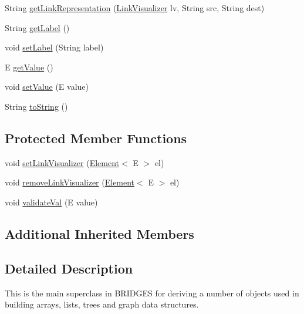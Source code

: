 \begin{DoxyCompactItemize}
\item 
String \hyperlink{classbridges_1_1base_1_1_element_ae32deb37d1ad95d2fdfaa616062f319d}{get\+Link\+Representation} (\hyperlink{classbridges_1_1base_1_1_link_visualizer}{Link\+Visualizer} lv, String src, String dest)
\item 
String \hyperlink{classbridges_1_1base_1_1_element_a5c831a0238de487765f6021a887f1542}{get\+Label} ()
\item 
void \hyperlink{classbridges_1_1base_1_1_element_a942ccd766aeca0c4fdbe27ef8cbe78d9}{set\+Label} (String label)
\item 
E \hyperlink{classbridges_1_1base_1_1_element_a44ddc61db34b6cf0bab7dfba667d54af}{get\+Value} ()
\item 
void \hyperlink{classbridges_1_1base_1_1_element_ab3cf1241da0bc4c59cea9d6f0fd7aaf4}{set\+Value} (E value)
\item 
String \hyperlink{classbridges_1_1base_1_1_element_a7dc685e317fd9dc2e73e049a9f907e42}{to\+String} ()
\end{DoxyCompactItemize}
\subsection*{Protected Member Functions}
\begin{DoxyCompactItemize}
\item 
void \hyperlink{classbridges_1_1base_1_1_element_af6251f52b9d277dd77e3bab1829d0197}{set\+Link\+Visualizer} (\hyperlink{classbridges_1_1base_1_1_element}{Element}$<$ E $>$ el)
\item 
void \hyperlink{classbridges_1_1base_1_1_element_a144cd54e043a801fab326769a5da01e2}{remove\+Link\+Visualizer} (\hyperlink{classbridges_1_1base_1_1_element}{Element}$<$ E $>$ el)
\item 
void \hyperlink{classbridges_1_1base_1_1_element_af1a60f4e6a91d379179f7d56e6dc3829}{validate\+Val} (E value)
\end{DoxyCompactItemize}
\subsection*{Additional Inherited Members}


\subsection{Detailed Description}
This is the main superclass in B\+R\+I\+D\+G\+E\+S for deriving a number of objects used in building arrays, lists, trees and graph data structures. 

